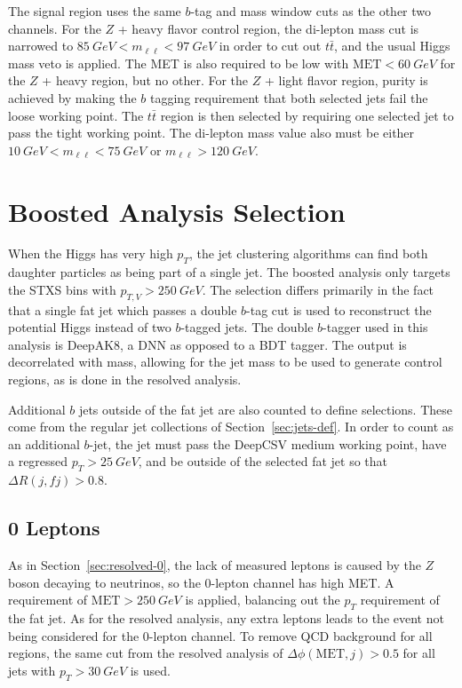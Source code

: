 The signal region uses the same $b$-tag and mass window cuts as the other two channels.
For the $Z$ + heavy flavor control region,
the di-lepton mass cut is narrowed to $\SI{85}{GeV} < m_{\ell\ell} < \SI{97}{GeV}$
in order to cut out $t\bar{t}$, and the usual Higgs mass veto is applied.
The MET is also required to be low with $\mathrm{MET} < \SI{60}{GeV}$
for the $Z$ + heavy region, but no other.
For the $Z$ + light flavor region, purity is achieved by making the $b$ tagging requirement
that both selected jets fail the loose working point.
The $t\bar{t}$ region is then selected by requiring
one selected jet to pass the tight working point.
The di-lepton mass value also must be either $\SI{10}{GeV} < m_{\ell\ell} < \SI{75}{GeV}$
or $m_{\ell\ell} > \SI{120}{GeV}$.

\section{Boosted Analysis Selection}

When the Higgs has very high $p_T$,
the jet clustering algorithms can find both daughter particles
as being part of a single jet.
The boosted analysis only targets the STXS bins with $p_{T,V} > \SI{250}{GeV}$.
The selection differs primarily in the fact that a single fat jet
which passes a double $b$-tag cut \cite{Sirunyan_2018}
is used to reconstruct the potential Higgs instead of two $b$-tagged jets.
The double $b$-tagger used in this analysis is DeepAK8,
a DNN as opposed to a BDT tagger.
The output is decorrelated with mass, allowing for the jet mass to be used
to generate control regions, as is done in the resolved analysis.

Additional $b$ jets outside of the fat jet are also counted to define selections.
These come from the regular jet collections of Section~\ref{sec:jets-def}.
In order to count as an additional $b$-jet,
the jet must pass the DeepCSV medium working point,
have a regressed $p_T > \SI{25}{GeV}$, and be outside of the selected fat jet
so that $\Delta R(j, fj) > 0.8$.

\subsection{0 Leptons}

As in Section~\ref{sec:resolved-0}, the lack of measured leptons is caused by
the $Z$ boson decaying to neutrinos, so the 0-lepton channel has high MET.
A requirement of $\mathrm{MET} > \SI{250}{GeV}$ is applied,
balancing out the $p_T$ requirement of the fat jet.
As for the resolved analysis, any extra leptons leads to the event not being considered
for the 0-lepton channel.
To remove QCD background for all regions, the same cut from the resolved analysis of
$\Delta \phi(\mathrm{MET}, j) > 0.5$ for all jets with $p_T > \SI{30}{GeV}$ is used.


